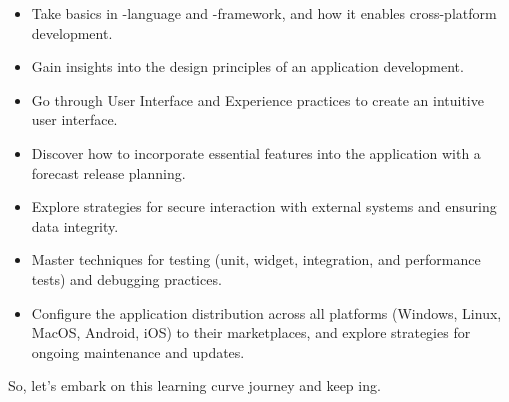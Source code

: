 \begin{itemize}
\setlength{\itemsep}{3pt}
\setlength{\parskip}{0pt}
\setlength{\parsep}{0pt}
  \item Take basics in -language and -framework, and how it enables cross-platform development.

  \item Gain insights into the design principles of an application development. 
  
  \item Go through User Interface and Experience practices to create an intuitive user interface.

  \item Discover how to incorporate essential features into the application with a forecast release planning.

  \item Explore strategies for secure interaction with external systems and ensuring data integrity.

  \item Master techniques for testing (unit, widget, integration, and performance tests) and debugging practices. 

  \item Configure the application distribution across all platforms (Windows, Linux, MacOS, Android, iOS) to their 
  marketplaces, and explore strategies for ongoing maintenance and updates.
\end{itemize}

\noindent So, let's embark on this learning curve journey and keep ing.